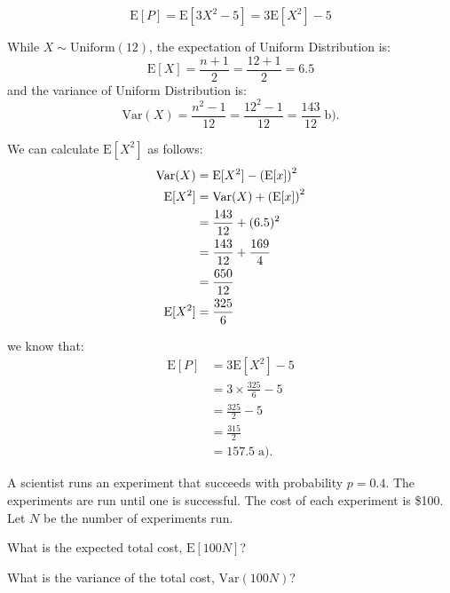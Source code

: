 \documentclass[a4paper, 10pt]{article}
\begin{document}
\begin{tosubmit}
	\[
		\text{E}[P] = \text{E}[3X^2 - 5] = 3\text{E}[X^2] - 5
	\]

	\par While \( X \sim \text{Uniform}(12) \), the expectation of Uniform Distribution is:
	\[
		\text{E}[X] = \frac{n+1}{2} = \frac{12+1}{2} = 6.5
	\]
	and the variance of Uniform Distribution is:
	\[
		\text{Var}(X) = \frac{n^2 - 1}{12} = \frac{12^2 - 1}{12} = \boxed{\frac{143}{12}} \; \text{b).}
	\]

	We can calculate \( \text{E}[X^2] \) as follows:
	\begin{align*}
		\text{Var}(X) & = \text{E}[X^2] - \left(\text{E}[x]\right)^2 \\
		\text{E}[X^2] & = \text{Var}(X) + \left(\text{E}[x]\right)^2 \\
		              & = \frac{143}{12} + (6.5)^2              \\
		              & = \frac{143}{12} + \frac{169}{4}        \\
		              & = \frac{650}{12}                        \\
		\text{E}[X^2] & = \frac{325}{6}
	\end{align*}

	we know that:
	\begin{align*}
		\text{E}[P] & = 3\text{E}[X^2] - 5          \\
		            & = 3 \times \frac{325}{6} - 5  \\
		            & = \frac{325}{2} - 5           \\
		            & = \frac{315}{2}               \\
		            & = \boxed{157.5} \; \text{a).}
	\end{align*}
\end{tosubmit}

\pagebreak

\begin{problem}
A scientist runs an experiment that succeeds with probability \( p = 0.4 \).
The experiments are run until one is successful. The cost of each experiment is \$100.
Let \( N \) be the number of experiments run.
\begin{subproblems_alpha}
	\item What is the expected total cost, \( \text{E}[100N] \)?
	\item What is the variance of the total cost, \( \text{Var}(100N) \)?
\end{subproblems_alpha}
\end{problem}
\end{document}
